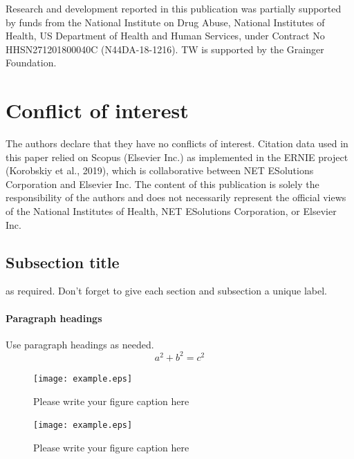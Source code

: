 \begin{acknowledgements}
Research and development reported in this publication was partially supported by funds from the National Institute on Drug Abuse, National Institutes of Health, US Department of Health and Human Services, under Contract No HHSN271201800040C (N44DA-18-1216). TW is supported by the Grainger Foundation.
\end{acknowledgements}

%
 \section*{Conflict of interest}
The authors declare that they have no conflicts of interest. Citation data used in this paper relied on Scopus (Elsevier Inc.) as implemented in the ERNIE project (Korobskiy et al., 2019), which is collaborative between NET ESolutions Corporation and Elsevier Inc. The content of this publication is solely the responsibility of the authors and does not necessarily represent the official views of the National Institutes of Health, NET ESolutions Corporation, or Elsevier Inc.








\subsection{Subsection title}
\label{sec:2}
as required. Don't forget to give each section
and subsection a unique label.
\paragraph{Paragraph headings} Use paragraph headings as needed.
\begin{equation}
a^2+b^2=c^2
\end{equation}

\begin{figure}
  \texttt{[image: example.eps]}
\caption{Please write your figure caption here}
\label{fig:1}       %
\end{figure}
%
\begin{figure}
  \texttt{[image: example.eps]}
\caption{Please write your figure caption here}
\label{fig:2}       %
\end{figure}

